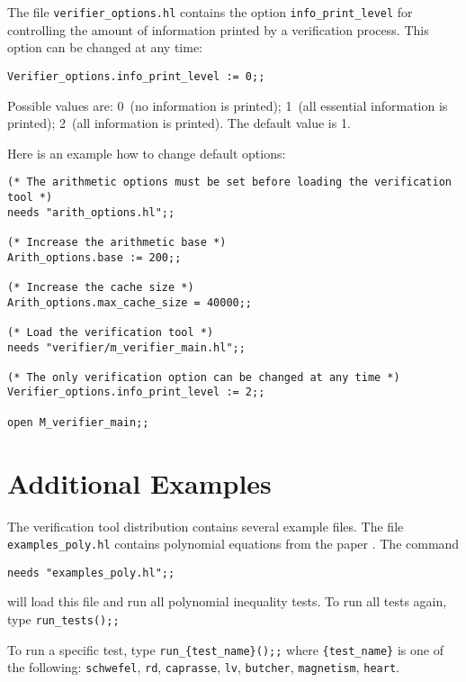 \documentclass[a4paper]{article}
\begin{document}
The file \verb|verifier_options.hl| contains the option \verb|info_print_level| for controlling the amount of information printed by a verification process. This option can be changed at any time:

\verb|Verifier_options.info_print_level := 0;;|

Possible values are: 0~(no information is printed); 1~(all essential information is printed); 2~(all information is printed). The default value is 1.

Here is an example how to change default options:
\begin{verbatim}
(* The arithmetic options must be set before loading the verification tool *)
needs "arith_options.hl";;

(* Increase the arithmetic base *)
Arith_options.base := 200;;

(* Increase the cache size *)
Arith_options.max_cache_size = 40000;;

(* Load the verification tool *)
needs "verifier/m_verifier_main.hl";;

(* The only verification option can be changed at any time *)
Verifier_options.info_print_level := 2;;

open M_verifier_main;;
\end{verbatim}

\section{Additional Examples}
The verification tool distribution contains several example files. The file \verb|examples_poly.hl| contains polynomial equations from the paper \cite{bernstein}. The command

\verb|needs "examples_poly.hl";;|

will load this file and run all polynomial inequality tests. To run all tests again, type \verb|run_tests();;|

To run a specific test, type \verb|run_{test_name}();;| where \verb|{test_name}| is one of the following: \verb|schwefel|, \verb|rd|, \verb|caprasse|, \verb|lv|, \verb|butcher|, \verb|magnetism|, \verb|heart|.
\end{document}
